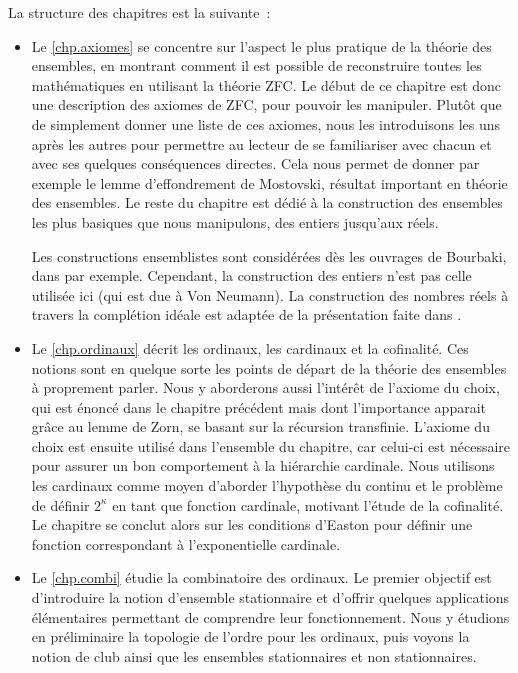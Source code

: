 La structure des chapitres est la suivante~:
\begin{itemize}
\item Le \cref{chp.axiomes} se concentre sur l'aspect le plus pratique de la
  théorie des ensembles, en montrant comment il est possible de reconstruire
  toutes les mathématiques en utilisant la théorie ZFC. Le début de ce chapitre
  est donc une description des axiomes de ZFC, pour pouvoir les manipuler.
  Plutôt que de simplement donner une liste de ces axiomes, nous les
  introduisons les uns après les autres pour permettre au lecteur de se
  familiariser avec chacun et avec ses quelques conséquences directes. Cela nous
  permet de donner par exemple le lemme d'effondrement de Mostovski, résultat
  important en théorie des ensembles. Le reste du chapitre est dédié à la
  construction des ensembles les plus basiques que nous manipulons, des entiers
  jusqu'aux réels.

  Les constructions ensemblistes sont considérées dès les ouvrages de Bourbaki,
  dans \cite{bourbaki2007théorie} par exemple. Cependant, la construction des
  entiers n'est pas celle utilisée ici (qui est due à Von Neumann). La
  construction des nombres réels à travers la complétion idéale est adaptée
  de la présentation faite dans \cite{DBLP:books/daglib/0093287}.
\item Le \cref{chp.ordinaux} décrit les ordinaux, les cardinaux et la
  cofinalité. Ces notions sont en quelque sorte les points de départ de la
  théorie des ensembles à proprement parler. Nous y aborderons aussi l'intérêt
  de l'axiome du choix, qui est énoncé dans le chapitre précédent mais dont
  l'importance apparait grâce au lemme de Zorn, se basant sur la récursion
  transfinie. L'axiome du choix est ensuite utilisé dans l'ensemble du chapitre,
  car celui-ci est nécessaire pour assurer un bon comportement à la hiérarchie
  cardinale. Nous utilisons les cardinaux comme moyen d'aborder l'hypothèse du
  continu et le problème de définir $2^\kappa$ en tant que fonction cardinale,
  motivant l'étude de la cofinalité. Le chapitre se conclut alors sur les
  conditions d'Easton pour définir une fonction correspondant à l'exponentielle
  cardinale.
\item Le \cref{chp.combi} étudie la combinatoire des ordinaux. Le premier
  objectif est d'introduire la notion d'ensemble stationnaire et d'offrir
  quelques applications élémentaires permettant de comprendre leur
  fonctionnement. Nous y étudions en préliminaire la topologie de l'ordre pour
  les ordinaux, puis voyons la notion de club ainsi que les ensembles
  stationnaires et non stationnaires.


\end{itemize}
